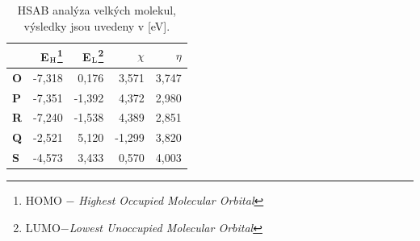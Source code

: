 \documentclass[
digital, %
table,   %
lof,     %
lot,     %
oneside,
]{fithesis3}
\begin{document}
\begin{table}[htbp]
\begin{minipage}{\textwidth}
\caption{HSAB analýza velkých molekul, výsledky jsou uvedeny v [eV].}
\begin{center}
\begin{tabular}{|l|r|r|r|r|}
\hline
\label{hsab_large} & E$_{\ce{H}}$\footnote{HOMO $-$ \textit{Highest Occupied Molecular Orbital}}  & E$_{\ce{L}}$\footnote{LUMO$ - $\textit{Lowest Unoccupied Molecular Orbital}} & $\chi$  & $\eta$  \\ \hline
\textbf{O} & -7,318 & 0,176 & 3,571 & 3,747 \\ \hline
\textbf{P} & -7,351 & -1,392 & 4,372 & 2,980 \\ \hline
\textbf{R} & -7,240 & -1,538 & 4,389 & 2,851 \\ \hline
\textbf{Q} & -2,521 & 5,120 & -1,299 & 3,820 \\ \hline
\textbf{S} & -4,573 & 3,433 & 0,570 & 4,003 \\ \hline
\end{tabular}
\end{center}
\end{minipage}
\end{table}
\end{document}
